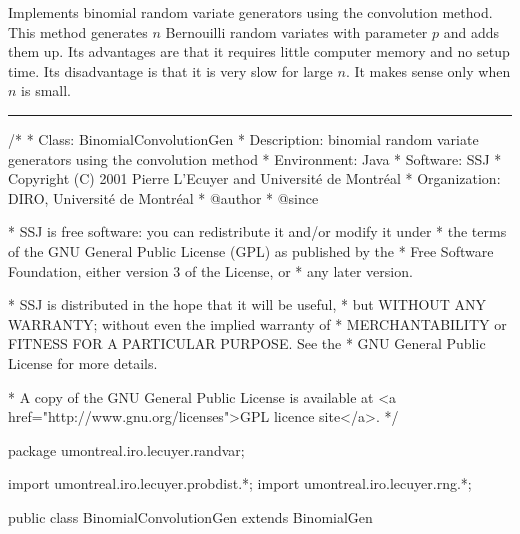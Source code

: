 
Implements binomial random variate generators using the 
convolution method.  
This method generates $n$ Bernouilli random variates with 
parameter $p$ and adds them up. 
Its advantages are that it requires
little computer memory and no setup time.
Its disadvantage is that it is very slow for large $n$.
It makes sense only when $n$ is small.


\bigskip\hrule

\begin{code}
\begin{hide}
/*
 * Class:        BinomialConvolutionGen
 * Description:  binomial random variate generators using the convolution method
 * Environment:  Java
 * Software:     SSJ 
 * Copyright (C) 2001  Pierre L'Ecuyer and Université de Montréal
 * Organization: DIRO, Université de Montréal
 * @author       
 * @since

 * SSJ is free software: you can redistribute it and/or modify it under
 * the terms of the GNU General Public License (GPL) as published by the
 * Free Software Foundation, either version 3 of the License, or
 * any later version.

 * SSJ is distributed in the hope that it will be useful,
 * but WITHOUT ANY WARRANTY; without even the implied warranty of
 * MERCHANTABILITY or FITNESS FOR A PARTICULAR PURPOSE.  See the
 * GNU General Public License for more details.

 * A copy of the GNU General Public License is available at
   <a href="http://www.gnu.org/licenses">GPL licence site</a>.
 */
\end{hide}
package umontreal.iro.lecuyer.randvar;\begin{hide}
import umontreal.iro.lecuyer.probdist.*;
import umontreal.iro.lecuyer.rng.*;\end{hide}

public class BinomialConvolutionGen extends BinomialGen \begin{hide} {
  
\end{hide}\end{code}

